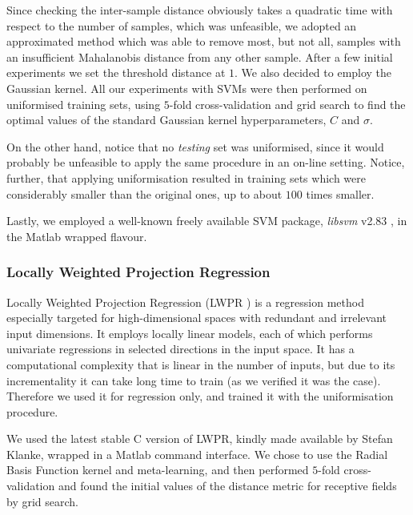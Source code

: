 Since checking the inter-sample distance obviously takes a quadratic
time with respect to the number of samples, which was unfeasible, we
adopted an approximated method which was able to remove most, but not
all, samples with an insufficient Mahalanobis distance from any other
sample. After a few initial experiments we set the threshold distance
at $1$. We also decided to employ the Gaussian kernel. All our
experiments with SVMs were then performed on uniformised training
sets, using $5$-fold cross-validation and grid search to find the
optimal values of the standard Gaussian kernel hyperparameters, $C$
and $\sigma$.

On the other hand, notice that no \emph{testing} set was uniformised,
since it would probably be unfeasible to apply the same procedure in
an on-line setting. Notice, further, that applying uniformisation
resulted in training sets which were considerably smaller than the
original ones, up to about $100$ times smaller.

Lastly, we employed a well-known freely available SVM package,
\emph{libsvm} v2.83 \cite{ChangL01}, in the Matlab wrapped flavour.

\subsubsection{Locally Weighted Projection Regression}

Locally Weighted Projection Regression (LWPR \cite{lwpr}) is a
regression method especially targeted for high-dimensional spaces
with redundant and irrelevant input dimensions. It employs locally
linear models, each of which performs univariate regressions in
selected directions in the input space. It has a computational
complexity that is linear in the number of inputs, but due to its
incrementality it can take long time to train (as we verified it
was the case). Therefore we used it for regression only, and
trained it with the uniformisation procedure.

We used the latest stable C version of LWPR, kindly made available by
Stefan Klanke, wrapped in a Matlab command interface. We chose to use
the Radial Basis Function kernel and meta-learning, and then
performed $5$-fold cross-validation and found the initial values of
the distance metric for receptive fields by grid search.
